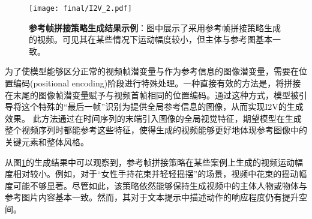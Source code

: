 \begin{figure}[htbp]
\centering
\texttt{[image: final/I2V\_2.pdf]}
\caption{\textbf{参考帧拼接策略生成结果示例}：图中展示了采用参考帧拼接策略生成的视频。可见其在某些情况下运动幅度较小，但主体与参考图基本一致。}
\label{I2V_2}
\end{figure}
为了使模型能够区分正常的视频帧潜变量与作为参考信息的图像潜变量，需要在位置编码(positional encoding)阶段进行特殊处理。一种直接有效的方法是，将拼接在末尾的图像帧潜变量赋予与视频首帧相同的位置编码。通过这种方式，模型被引导将这个特殊的“最后一帧”识别为提供全局参考信息的图像，从而实现I2V的生成效果。
此方法通过在时间序列的末端引入图像的全局视觉特征，期望模型在生成整个视频序列时都能参考这些特征，使得生成的视频能够更好地体现参考图像中的关键元素和整体风格。

从图\ref{I2V_2}的生成结果中可以观察到，参考帧拼接策略在某些案例上生成的视频运动幅度相对较小。例如，对于“女性手持花束并轻轻摇摆”的场景，视频中花束的摇动幅度可能不够显著。尽管如此，该策略依然能够保持生成视频中的主体人物或物体与参考图片内容基本一致。然而，其对于文本提示中描述动作的响应程度仍有提升空间。\\

